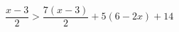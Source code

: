 \begin{ex}[type=inequality]
	\begin{condition}
		\( \dfrac{x-3}{2}>\dfrac{7(x-3)}{2}+5(6-2x)+14 \)
	\end{condition}
\end{ex}